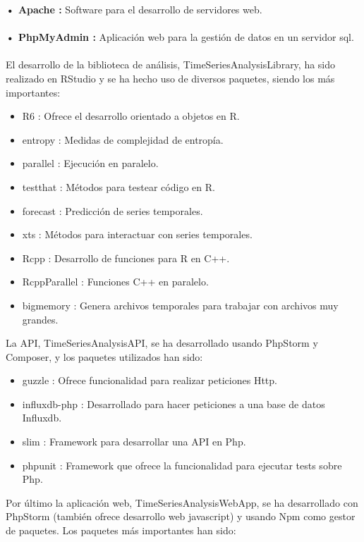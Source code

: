 \documentclass[14pt]{extarticle}
\theoremstyle{definition}
\theoremstyle{remark}
\begin{document}
\textbf{• Apache \citep{wiki:apache}:} Software para el desarrollo de servidores web.\\\\
\textbf{• PhpMyAdmin \citep{wiki:phpmyadmin}:} Aplicación web para la gestión de datos en un servidor sql.\\\\
El desarrollo de la biblioteca de análisis, TimeSeriesAnalysisLibrary, ha sido realizado en RStudio y se ha hecho uso de diversos paquetes, siendo los más importantes:
\begin{itemize}
	\item R6 \citep{pdf:r6}: Ofrece el desarrollo orientado a objetos en R.
	\item entropy \citep{pdf:entropy}: Medidas de complejidad de entropía.
	\item parallel \citep{pdf:parallel}: Ejecución en paralelo.
	\item testthat \citep{pdf:testthat}: Métodos para testear código en R.
	\item forecast \citep{pdf:forecast}: Predicción de series temporales.
	\item xts \citep{pdf:xts}: Métodos para interactuar con series temporales.
	\item Rcpp \citep{pdf:rcpp}: Desarrollo de funciones para R en C++.
	\item RcppParallel \citep{web:rcppparallel}: Funciones C++ en paralelo.
	\item bigmemory \citep{pdf:bigmemory}: Genera archivos temporales para trabajar con archivos muy grandes.
\end{itemize}
La API, TimeSeriesAnalysisAPI, se ha desarrollado usando PhpStorm y Composer, y los paquetes utilizados han sido:
\begin{itemize}
	\item guzzle \citep{github:guzzle}: Ofrece funcionalidad para realizar peticiones Http.
	\item influxdb-php \citep{github:influxdb}: Desarrollado para hacer peticiones a una base de datos Influxdb.
	\item slim \citep{web:slim}: Framework para desarrollar una API en Php.
	\item phpunit \citep{web:phpunit}: Framework que ofrece la funcionalidad para ejecutar tests sobre Php.
\end{itemize}
Por último la aplicación web, TimeSeriesAnalysisWebApp, se ha desarrollado con PhpStorm (también ofrece desarrollo web javascript) y usando Npm como gestor de paquetes. Los paquetes más importantes han sido:
\end{document}
